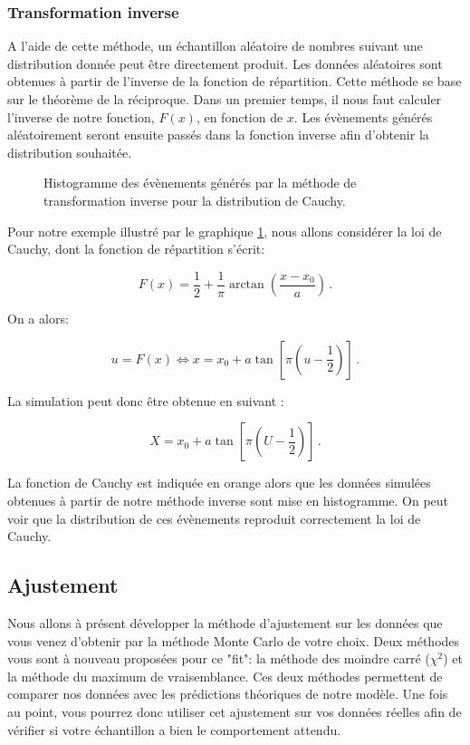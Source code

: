 \subsubsection{Transformation inverse}
A l'aide de cette méthode,  un échantillon aléatoire de nombres suivant une distribution donnée peut être directement produit. Les données aléatoires sont obtenues à partir de l'inverse de la fonction de répartition. Cette méthode se base sur le théorème de la réciproque. Dans un premier temps, il nous faut calculer l'inverse de notre fonction, $F(x)$, en fonction de $x$. Les évènements générés aléatoirement seront ensuite passés dans la fonction inverse afin d'obtenir la distribution souhaitée. 

\begin{figure}[h!]
\caption{Histogramme des évènements générés par la méthode de transformation inverse pour la distribution de Cauchy.}
\label{fig:Inverse}
\end{figure}

Pour notre exemple illustré par le graphique \ref{fig:Inverse}, nous allons considérer la loi de Cauchy, dont la fonction de répartition s'écrit:

\begin{equation}
F(x) = \frac{1}{2} + \frac{1}{\pi} \arctan \left(\frac{x - x_{0}}{a}\right) \, .
\end{equation}

On a alors:

\begin{equation}
u = F(x) \Longleftrightarrow x = x_{0} + a \tan \left[ \pi  \left(u - \frac{1}{2} \right)  \right] \, .
\end{equation}

La simulation peut donc être obtenue en suivant :

\begin{equation}
X = x_{0} + a \tan \left[ \pi  \left(U - \frac{1}{2} \right)  \right] \, .
\end{equation}

La fonction de Cauchy est indiquée en orange alors que les données simulées obtenues à partir de notre méthode inverse sont mise en histogramme. On peut voir que la distribution de ces évènements reproduit correctement la loi de Cauchy.

\subsection{Ajustement}
Nous allons à présent développer la méthode d'ajustement sur les données que vous venez d'obtenir par la méthode Monte Carlo de votre choix. Deux méthodes vous sont à nouveau proposées pour ce "fit": la méthode des moindre carré ($\chi^2$) et la méthode du maximum de vraisemblance. Ces deux méthodes permettent de comparer nos données avec les prédictions théoriques de notre modèle. Une fois au point, vous pourrez donc utiliser cet ajustement sur vos données réelles afin de vérifier si votre échantillon a bien le comportement attendu. 

